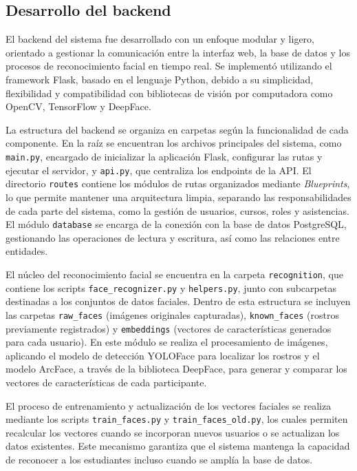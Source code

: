 \subsection{Desarrollo del backend}

El backend del sistema fue desarrollado con un enfoque modular y ligero, orientado a gestionar la comunicación entre la interfaz web, la base de datos y los procesos de reconocimiento facial en tiempo real. Se implementó utilizando el framework Flask, basado en el lenguaje Python, debido a su simplicidad, flexibilidad y compatibilidad con bibliotecas de visión por computadora como OpenCV, TensorFlow y DeepFace.

La estructura del backend se organiza en carpetas según la funcionalidad de cada componente. En la raíz se encuentran los archivos principales del sistema, como \texttt{main.py}, encargado de inicializar la aplicación Flask, configurar las rutas y ejecutar el servidor, y \texttt{api.py}, que centraliza los endpoints de la API.  
El directorio \texttt{routes} contiene los módulos de rutas organizados mediante \textit{Blueprints}, lo que permite mantener una arquitectura limpia, separando las responsabilidades de cada parte del sistema, como la gestión de usuarios, cursos, roles y asistencias.  
El módulo \texttt{database} se encarga de la conexión con la base de datos PostgreSQL, gestionando las operaciones de lectura y escritura, así como las relaciones entre entidades.  

El núcleo del reconocimiento facial se encuentra en la carpeta \texttt{recognition}, que contiene los scripts \texttt{face\_recognizer.py} y \texttt{helpers.py}, junto con subcarpetas destinadas a los conjuntos de datos faciales. Dentro de esta estructura se incluyen las carpetas \texttt{raw\_faces} (imágenes originales capturadas), \texttt{known\_faces} (rostros previamente registrados) y \texttt{embeddings} (vectores de características generados para cada usuario).  
En este módulo se realiza el procesamiento de imágenes, aplicando el modelo de detección YOLOFace para localizar los rostros y el modelo ArcFace, a través de la biblioteca DeepFace, para generar y comparar los vectores de características de cada participante.  

El proceso de entrenamiento y actualización de los vectores faciales se realiza mediante los scripts \texttt{train\_faces.py} y \texttt{train\_faces\_old.py}, los cuales permiten recalcular los vectores cuando se incorporan nuevos usuarios o se actualizan los datos existentes. Este mecanismo garantiza que el sistema mantenga la capacidad de reconocer a los estudiantes incluso cuando se amplía la base de datos.

